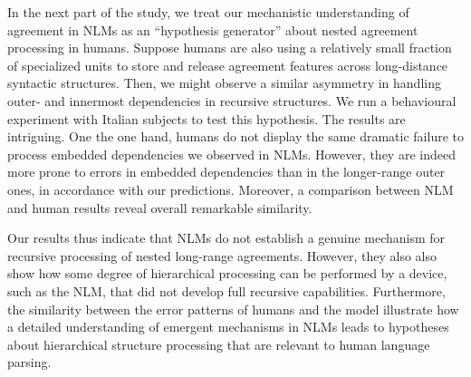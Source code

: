 In the next part of the study, we treat our mechanistic understanding of
agreement in NLMs as an ``hypothesis generator''
\citep{Cichy:Kaiser:2019} about nested agreement processing in
humans. Suppose humans are also using a relatively small fraction of specialized units
to store and release agreement features across long-distance syntactic
structures. Then, we might observe a similar asymmetry in handling
outer- and innermost dependencies in recursive structures. We run a
behavioural experiment with Italian subjects to test this
hypothesis. The results are intriguing. One the one hand, humans do
not display the same dramatic failure to process embedded dependencies we observed in NLMs. However, they are indeed more prone to errors in embedded dependencies than in the longer-range outer ones, in accordance with our predictions. Moreover, a comparison between NLM and human results reveal overall remarkable similarity. 

Our results thus indicate that NLMs do not establish a genuine mechanism for recursive processing of nested long-range agreements. However, they also also show how some degree of hierarchical processing can be performed by a device, such as the NLM, that did not develop full recursive capabilities. Furthermore, the similarity between the error patterns of humans and the model illustrate how %
a detailed understanding of emergent mechanisms in NLMs leads to hypotheses about hierarchical structure processing that are relevant to human language parsing.







